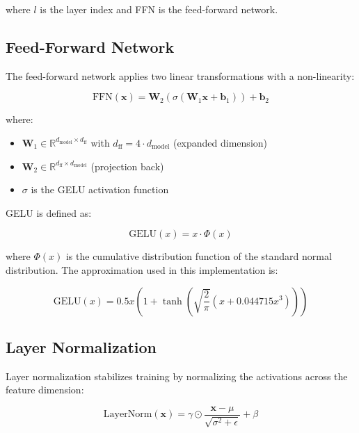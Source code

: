 \documentclass[11pt,a4paper]{article}
\begin{document}
where $l$ is the layer index and FFN is the feed-forward network.

\subsection{Feed-Forward Network}

The feed-forward network applies two linear transformations with a non-linearity:

\begin{equation}
\text{FFN}(\mathbf{x}) = \mathbf{W}_2(\sigma(\mathbf{W}_1\mathbf{x} + \mathbf{b}_1)) + \mathbf{b}_2
\end{equation}

where:
\begin{itemize}
    \item $\mathbf{W}_1 \in \mathbb{R}^{d_{\text{model}} \times d_{\text{ff}}}$ with $d_{\text{ff}} = 4 \cdot d_{\text{model}}$ (expanded dimension)
    \item $\mathbf{W}_2 \in \mathbb{R}^{d_{\text{ff}} \times d_{\text{model}}}$ (projection back)
    \item $\sigma$ is the GELU activation function
\end{itemize}

GELU is defined as:

\begin{equation}
\text{GELU}(x) = x \cdot \Phi(x)
\end{equation}

where $\Phi(x)$ is the cumulative distribution function of the standard normal distribution. The approximation used in this implementation is:

\begin{equation}
\text{GELU}(x) = 0.5x\left(1 + \tanh\left(\sqrt{\frac{2}{\pi}}(x + 0.044715x^3)\right)\right)
\end{equation}

\subsection{Layer Normalization}

Layer normalization stabilizes training by normalizing the activations across the feature dimension:

\begin{equation}
\text{LayerNorm}(\mathbf{x}) = \gamma \odot \frac{\mathbf{x} - \mu}{\sqrt{\sigma^2 + \epsilon}} + \beta
\end{equation}
\end{document}
